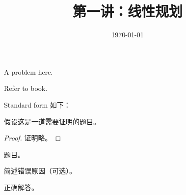 \documentclass[11pt, a4paper, UTF8]{ctexart}
\title{第一讲：线性规划}
\date{\today}
\begin{document}
\maketitle
\beginthishw	%

\begin{problem}[29.1-4]	%
  A problem here.
\end{problem}

\begin{remark}	
  Refer to book.
\end{remark}

\begin{solution}
  Standard form 如下：
\end{solution}
\begin{problem}[xx.x-x]
  假设这是一道需要证明的题目。	
\end{problem}


\begin{proof}
  证明略。	
\end{proof}
\beginlasthw	%

\begin{problem}[28.1-2]
  题目。
\end{problem}

\begin{cause}
  简述错误原因（可选）。
\end{cause}

\begin{revision}
  正确解答。
\end{revision}
\beginfb	%
\end{document}
